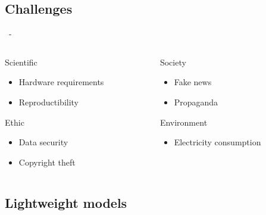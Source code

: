 \documentclass[aspectratio=169, 22pt]{beamer}
\begin{document}
\subsection{Challenges}
\begin{frame}{\secname~- \subsecname}
  \begin{columns}
    \begin{column}{0.5\linewidth}
      \begin{customblock}{Scientific}
        \begin{itemize}
        \item Hardware requirements
        \item Reproductibility
        \end{itemize}
      \end{customblock}
      \pause
      \begin{block}{Ethic}
        \begin{itemize}
        \item Data security
        \item Copyright theft
        \end{itemize}
      \end{block}
    \end{column}
    \begin{column}{0.5\linewidth}
      \pause
      \begin{alertblock}{Society}
        \begin{itemize}
        \item Fake news
        \item Propaganda
        \end{itemize}
      \end{alertblock}
      \pause
      \begin{exampleblock}{Environment}
        \begin{itemize}
        \item Electricity consumption
        \end{itemize}
      \end{exampleblock}
    \end{column}
  \end{columns}
\end{frame}

\subsection{Lightweight models}
\end{document}
